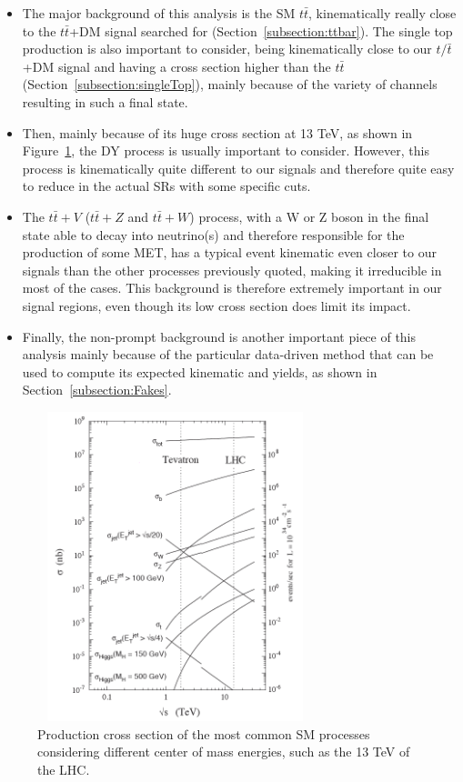 \documentclass[a4paper, 10pt, openright]{report}
\begin{document}
\begin{itemize}
\item The major background of this analysis is the \ac{SM} $t \bar t$, kinematically really close to the $t \bar t$+DM signal searched for (Section~\ref{subsection:ttbar}). The single top production is also important to consider, being kinematically close to our $t/\bar t$+DM signal and having a cross section higher than the $t \bar t$ (Section~\ref{subsection:singleTop}), mainly because of the variety of channels resulting in such a final state.
\item Then, mainly because of its huge cross section at 13 TeV, as shown in Figure~\ref{fig:ProcessesXS}, the \ac{DY} process is usually important to consider. However, this process is kinematically quite different to our signals and therefore quite easy to reduce in the actual \acp{SR} with some specific cuts.%
\item The $t \bar t + V$ ($t \bar t + Z$ and $t \bar t + W$) process, with a W or Z boson in the final state able to decay into neutrino(s) and therefore responsible for the production of some \ac{MET}, has a typical event kinematic even closer to our signals than the other processes previously quoted, making it irreducible in most of the cases. This background is therefore extremely important in our signal regions, even though its low cross section does limit its impact.%
\item Finally, the non-prompt background is another important piece of this analysis mainly because of the particular data-driven method that can be used to compute its expected kinematic and yields, as shown in Section~\ref{subsection:Fakes}.
\end{itemize}

\begin{figure}[htbp]
\begin{center}
\includegraphics[width=8cm, height=9cm]{figs/ProcessesXS.png}
\caption{Production cross section of the most common \ac{SM} processes considering different center of mass energies, such as the 13 TeV of the \ac{LHC}.}
\label{fig:ProcessesXS}
\end{center}
\end{figure}
\end{document}
